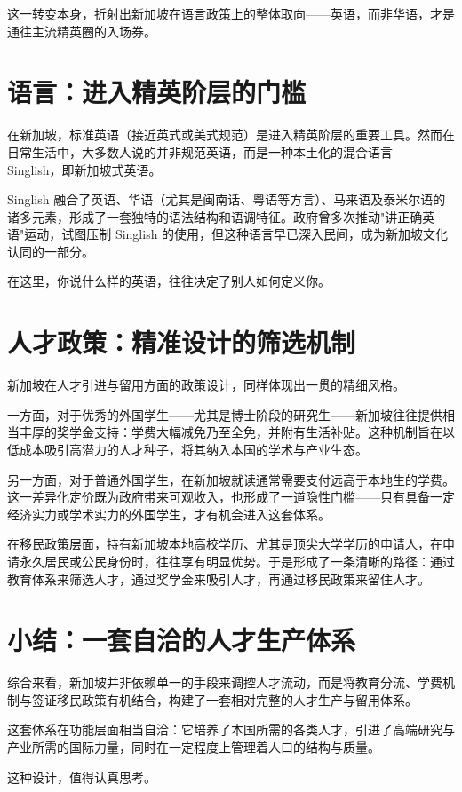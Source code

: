 这一转变本身，折射出新加坡在语言政策上的整体取向——英语，而非华语，才是通往主流精英圈的入场券。

\section{语言：进入精英阶层的门槛}

在新加坡，标准英语（接近英式或美式规范）是进入精英阶层的重要工具。然而在日常生活中，大多数人说的并非规范英语，而是一种本土化的混合语言——Singlish，即新加坡式英语。

Singlish 融合了英语、华语（尤其是闽南话、粤语等方言）、马来语及泰米尔语的诸多元素，形成了一套独特的语法结构和语调特征。政府曾多次推动"讲正确英语"运动，试图压制 Singlish 的使用，但这种语言早已深入民间，成为新加坡文化认同的一部分。

在这里，你说什么样的英语，往往决定了别人如何定义你。

\section{人才政策：精准设计的筛选机制}

新加坡在人才引进与留用方面的政策设计，同样体现出一贯的精细风格。

一方面，对于优秀的外国学生——尤其是博士阶段的研究生——新加坡往往提供相当丰厚的奖学金支持：学费大幅减免乃至全免，并附有生活补贴。这种机制旨在以低成本吸引高潜力的人才种子，将其纳入本国的学术与产业生态。

另一方面，对于普通外国学生，在新加坡就读通常需要支付远高于本地生的学费。这一差异化定价既为政府带来可观收入，也形成了一道隐性门槛——只有具备一定经济实力或学术实力的外国学生，才有机会进入这套体系。

在移民政策层面，持有新加坡本地高校学历、尤其是顶尖大学学历的申请人，在申请永久居民或公民身份时，往往享有明显优势。于是形成了一条清晰的路径：通过教育体系来筛选人才，通过奖学金来吸引人才，再通过移民政策来留住人才。

\section{小结：一套自洽的人才生产体系}

综合来看，新加坡并非依赖单一的手段来调控人才流动，而是将教育分流、学费机制与签证移民政策有机结合，构建了一套相对完整的人才生产与留用体系。

这套体系在功能层面相当自洽：它培养了本国所需的各类人才，引进了高端研究与产业所需的国际力量，同时在一定程度上管理着人口的结构与质量。

这种设计，值得认真思考。
